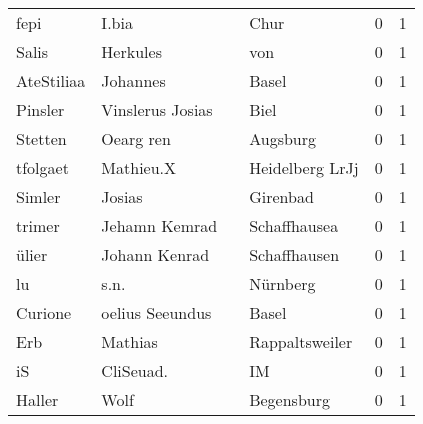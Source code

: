 \begin{tabular}{llllrr}
                     fepi &                              I.bia &             &                                        Chur &          0 &         1 \\
                    Salis &                           Herkules &             &                                         von &          0 &         1 \\
               AteStiliaa &                           Johannes &             &                                       Basel &          0 &         1 \\
                  Pinsler &                   Vinslerus Josias &             &                                        Biel &          0 &         1 \\
                  Stetten &                          Oearg ren &             &                                    Augsburg &          0 &         1 \\
                 tfolgaet &                          Mathieu.X &             &                             Heidelberg LrJj &          0 &         1 \\
                   Simler &                             Josias &             &                                    Girenbad &          0 &         1 \\
                   trimer &                      Jehamn Kemrad &             &                                Schaffhausea &          0 &         1 \\
                    ülier &                      Johann Kenrad &             &                                Schaffhausen &          0 &         1 \\
                       lu &                               s.n. &             &                                    Nürnberg &          0 &         1 \\
                  Curione &                    oelius Seeundus &             &                                       Basel &          0 &         1 \\
                      Erb &                            Mathias &             &                              Rappaltsweiler &          0 &         1 \\
                       iS &                          CliSeuad. &             &                                          IM &          0 &         1 \\
                   Haller &                               Wolf &             &                                  Begensburg &          0 &         1 \\

\end{tabular}
